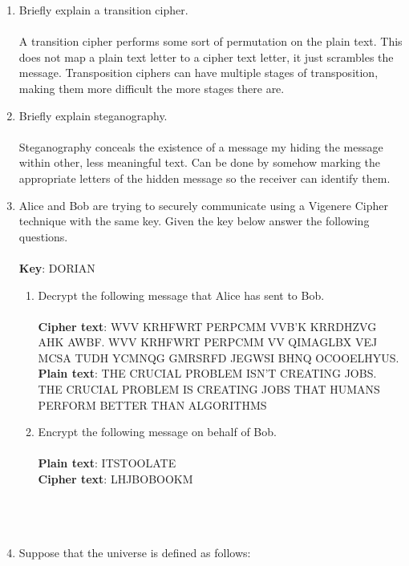 \documentclass[a4paper]{article}
\begin{document}
\begin{enumerate}
	\item	Briefly explain a transition cipher.\\\\
		A transition cipher performs some sort of permutation on the plain text. This does not
		map a plain text letter to a cipher text letter, it just scrambles the message. Transposition
		ciphers can have multiple stages of transposition, making them more difficult the more
		stages there are.\\
	\item	Briefly explain steganography.\\\\
		Steganography conceals the existence of a message my hiding the message within other, less
		meaningful text. Can be done by somehow marking the appropriate letters of the hidden
		message so the receiver can identify them.\\
	\item	Alice and Bob are trying to securely communicate using a Vigenere Cipher technique with the
		same key. Given the key below answer the following questions.\\\\
		\textbf{Key}: DORIAN
		\begin{enumerate}
			\item Decrypt the following message that Alice has sent to Bob.\\\\
				\textbf{Cipher text}: WVV KRHFWRT PERPCMM VVB'K KRRDHZVG AHK AWBF.
				WVV KRHFWRT PERPCMM VV QIMAGLBX VEJ MCSA TUDH YCMNQG GMRSRFD
				JEGWSI BHNQ OCOOELHYUS.\\
				\textbf{Plain text}: THE CRUCIAL PROBLEM ISN'T CREATING JOBS. THE CRUCIAL
				PROBLEM IS CREATING JOBS THAT HUMANS PERFORM BETTER THAN ALGORITHMS\\
			\item	Encrypt the following message on behalf of Bob.\\\\
				\textbf{Plain text}: ITSTOOLATE\\
				\textbf{Cipher text}: LHJBOBOOKM\\\\\\\\
		\end{enumerate}
	\item	Suppose that the universe is defined as follows:\\
		\begin{equation}

\end{equation}
\end{enumerate}
\end{document}
